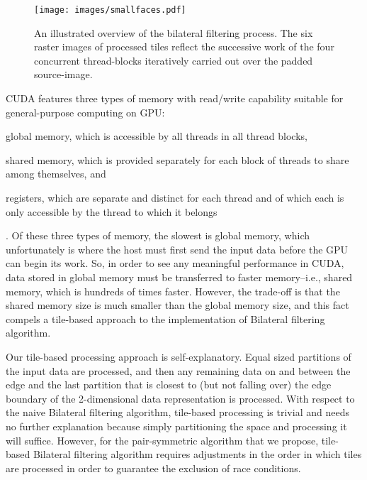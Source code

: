 \documentclass{IEEEtran}
\begin{document}
\begin{figure}
\texttt{[image: images/smallfaces.pdf]}
\caption{An illustrated overview of the bilateral filtering process. The six raster images of processed tiles reflect the successive work of the four concurrent thread-blocks iteratively carried out over the padded source-image.}
\label{fig:pspro}
\end{figure}

CUDA features three types of memory with read/write capability suitable for general-purpose computing on GPU: \begin{inparaenum}[(i)] \item global memory, which is accessible by all threads in all thread blocks, \item shared memory, which is provided separately for each block of threads to share among themselves, and \item registers, which are separate and distinct for each thread and of which each is only accessible by the thread to which it belongs\end{inparaenum}. Of these three types of memory, the slowest is global memory, which unfortunately is where the host must first send the input data before the GPU can begin its work. So, in order to see any meaningful performance in CUDA, data stored in global memory must be transferred to faster memory--i.e., shared memory, which is hundreds of times faster. However, the trade-off is that the shared memory size is much smaller than the global memory size, and this fact compels a tile-based approach to the implementation of Bilateral filtering algorithm.

Our tile-based processing approach is self-explanatory. Equal sized partitions of the input data are processed, and then any remaining data on and between the edge and the last partition that is closest to (but not falling over) the edge boundary of the 2-dimensional data representation is processed. With respect to the naive Bilateral filtering algorithm, tile-based processing is trivial and needs no further explanation because simply partitioning the space and processing it will suffice. However, for the pair-symmetric algorithm that we propose, tile-based Bilateral filtering algorithm requires adjustments in the order in which tiles are processed in order to guarantee the exclusion of race conditions. 
\end{document}

